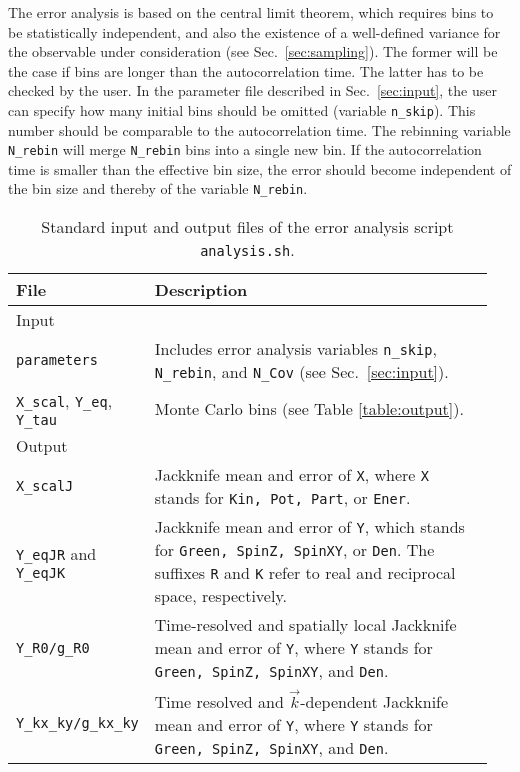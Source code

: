 %
The error analysis is based on the central limit theorem, which requires bins to be statistically independent, and also the existence of a well-defined variance for the observable under consideration (see Sec.~\ref{sec:sampling}).
The former will be the case if bins are  longer than the autocorrelation time.  The latter has to be checked by the user.  In the parameter file described in Sec.~\ref{sec:input}, the user  can specify how many initial bins should be omitted (variable \texttt{n\_skip}). 
This  number should be comparable to the autocorrelation time.     
The  rebinning  variable \texttt{N\_rebin} will merge \texttt{N\_rebin}  bins into a single new bin. 
If the autocorrelation time  is smaller than the effective bin size, the error should become independent of the bin size and thereby of the variable \texttt{N\_rebin}.
%
\begin{table}[h]
	\begin{center}
		\begin{tabular}{@{} p{0.2\linewidth} p{0.75\linewidth} @{}}\toprule
		File & Description  \\ \midrule
		Input &  \\\midrule %
		\texttt{parameters}  &  Includes error analysis variables \texttt{n\_skip}, \texttt{N\_rebin}, and \texttt{N\_Cov} (see Sec.~\ref{sec:input}). \\
		\texttt{X\_scal}, \texttt{Y\_eq}, \texttt{Y\_tau} & Monte Carlo bins (see Table \ref{table:output}). \vspace{5pt} \\

		Output &  \\\midrule
		\texttt{X\_scalJ} & Jackknife mean and error of \texttt{X}, where  \texttt{X} stands for \texttt{Kin, Pot, Part}, or \texttt{Ener}.\\
		\texttt{Y\_eqJR} and \texttt{Y\_eqJK} & Jackknife mean and error of \texttt{Y}, which stands for \texttt{Green, SpinZ, SpinXY}, or \texttt{Den}. The suffixes \texttt{R} and \texttt{K} refer to real and reciprocal space, respectively.\\
		\texttt{Y\_R0/g\_R0} & Time-resolved and spatially local Jackknife mean and error of \texttt{Y}, where \texttt{Y} stands for \texttt{Green, SpinZ, SpinXY}, and \texttt{Den}.\\
		\texttt{Y\_kx\_ky/g\_kx\_ky} & Time resolved and $\vec{k}$-dependent Jackknife mean and error of \texttt{Y}, where \texttt{Y} stands for \texttt{Green, SpinZ, SpinXY}, and \texttt{Den}.\\\bottomrule
	\end{tabular}
	\caption{ Standard input and output files of the error analysis script \texttt{analysis.sh}. \label{table:analysis_files}}
\end{center}
\end{table}
